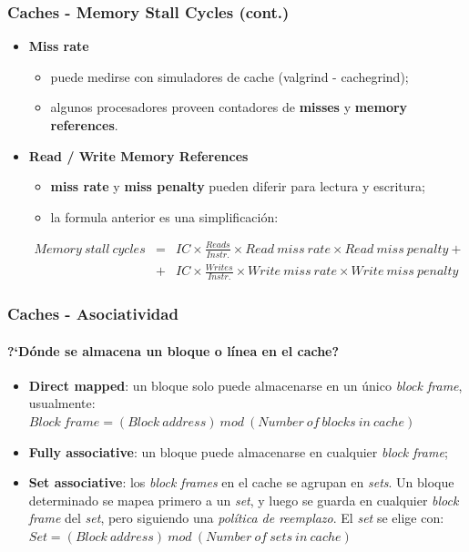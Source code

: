 \documentclass{beamer}
\begin{document}
  
\begin{frame}
\frametitle{Caches - Memory Stall Cycles (cont.)}
    \begin{itemize}
        \item \textbf{Miss rate}
        \begin{itemize}
            \item puede medirse con simuladores de cache (valgrind - cachegrind);
            \item algunos procesadores proveen contadores de \textbf{misses} y \textbf{memory references}.
        \end{itemize}
        \bigskip
        \item \textbf{Read / Write Memory References}
        \begin{itemize}
            \item \textbf{miss rate} y \textbf{miss penalty} pueden diferir para lectura y escritura;
            \item la formula anterior es una simplificación:
        \end{itemize}
	
      \tiny

        \begin{eqnarray*}
            Memory\ stall\ cycles & = & IC \times \frac{Reads}{Instr.} \times
            Read\ miss\ rate \times Read\ miss\ penalty + 
            \nonumber\\
            & + & IC \times \frac{Writes}{Instr.} \times
            Write\ miss\ rate \times Write\ miss\ penalty
        \end{eqnarray*}

    \end{itemize}
  \end{frame}

    \begin{frame}
    \frametitle{Caches - Asociatividad}
    \framesubtitle{?`Dónde se almacena un bloque o línea en el cache?}

    \begin{itemize}
      \item \textbf{Direct mapped}: un bloque solo puede almacenarse
      en un único \emph{block frame}, usualmente:\\
      
      $Block\ frame = (Block\ address)\ mod\ (Number\ of\ blocks\ in\ cache)$
      
      \item \textbf{Fully associative}: un bloque puede almacenarse en
      cualquier \emph{block frame};
      \item \textbf{Set associative}: los \emph{block frames} en el cache se
      agrupan en \emph{sets}. Un bloque determinado se mapea primero a un
      \emph{set}, y luego se guarda en cualquier \emph{block frame} del
      \emph{set}, pero siguiendo una \emph{política de reemplazo}.
      El \emph{set} se elige con:\\
      
      $Set = (Block\ address)\ mod\ (Number\ of\ sets\ in\ cache)$
    
    \end{itemize}
  \end{frame}
  
\end{document}
